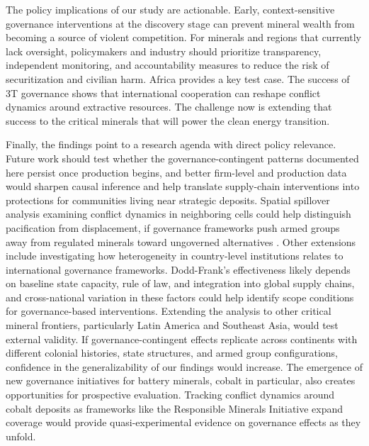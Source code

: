 \documentclass[11pt]{article}
\begin{document}
The policy implications of our study are actionable. Early, context-sensitive governance interventions at the discovery stage can prevent mineral wealth from becoming a source of violent competition. For minerals and regions that currently lack oversight, policymakers and industry should prioritize transparency, independent monitoring, and accountability measures to reduce the risk of securitization and civilian harm. Africa provides a key test case. The success of 3T governance shows that international cooperation can reshape conflict dynamics around extractive resources. The challenge now is extending that success to the critical minerals that will power the clean energy transition.

Finally, the findings point to a research agenda with direct policy relevance. Future work should test whether the governance-contingent patterns documented here persist once production begins, and better firm-level and production data would sharpen causal inference and help translate supply-chain interventions into protections for communities living near strategic deposits. Spatial spillover analysis examining conflict dynamics in neighboring cells could help distinguish pacification from displacement, if governance frameworks push armed groups away from regulated minerals toward ungoverned alternatives \citep{berman2017spillover}. Other extensions include investigating how heterogeneity in country-level institutions relates to international governance frameworks. Dodd-Frank's effectiveness likely depends on baseline state capacity, rule of law, and integration into global supply chains, and cross-national variation in these factors could help identify scope conditions for governance-based interventions. Extending the analysis to other critical mineral frontiers, particularly Latin America and Southeast Asia, would test external validity. If governance-contingent effects replicate across continents with different colonial histories, state structures, and armed group configurations, confidence in the generalizability of our findings would increase. The emergence of new governance initiatives for battery minerals, cobalt in particular, also creates opportunities for prospective evaluation. Tracking conflict dynamics around cobalt deposits as frameworks like the Responsible Minerals Initiative expand coverage would provide quasi-experimental evidence on governance effects as they unfold.


\end{document}
